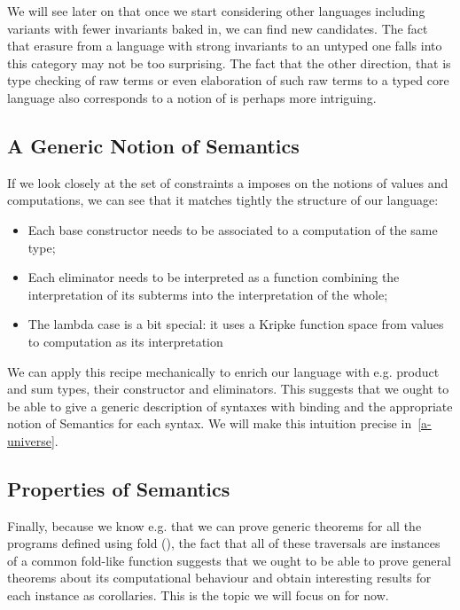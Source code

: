 We will see later on that once we start considering other languages including
variants with fewer invariants baked in, we can find new candidates. The fact
that erasure from a language with strong invariants to an untyped one falls
into this category may not be too surprising. The fact that the other direction,
that is type checking of raw terms or even elaboration of such raw terms to a
typed core language also corresponds to a notion of  is perhaps
more intriguing.

\subsection{A Generic Notion of Semantics}

If we look closely at the set of constraints a  imposes on the
notions of values and computations, we can see that it matches tightly the
structure of our language:

\begin{itemize}
  \item Each base constructor needs to be associated to a computation of the
    same type;
  \item Each eliminator needs to be interpreted as a function combining the
    interpretation of its subterms into the interpretation of the whole;
  \item The lambda case is a bit special: it uses a Kripke function space
    from values to computation as its interpretation
\end{itemize}

We can apply this recipe mechanically to enrich our language with e.g.
product and sum types, their constructor and eliminators. This suggests
that we ought to be able to give a generic description of syntaxes with
binding and the appropriate notion of Semantics for each syntax. We will
make this intuition precise in~\cref{a-universe}.

\subsection{Properties of Semantics}

Finally, because we know e.g. that we can prove generic theorems for all the
programs defined using fold (\cite{DBLP:journals/scp/Malcolm90}), the fact
that all of these traversals are instances of a common fold-like function
suggests that we ought to be able to prove general theorems about its
computational behaviour and obtain interesting results for each instance
as corollaries. This is the topic we will focus on for now.
